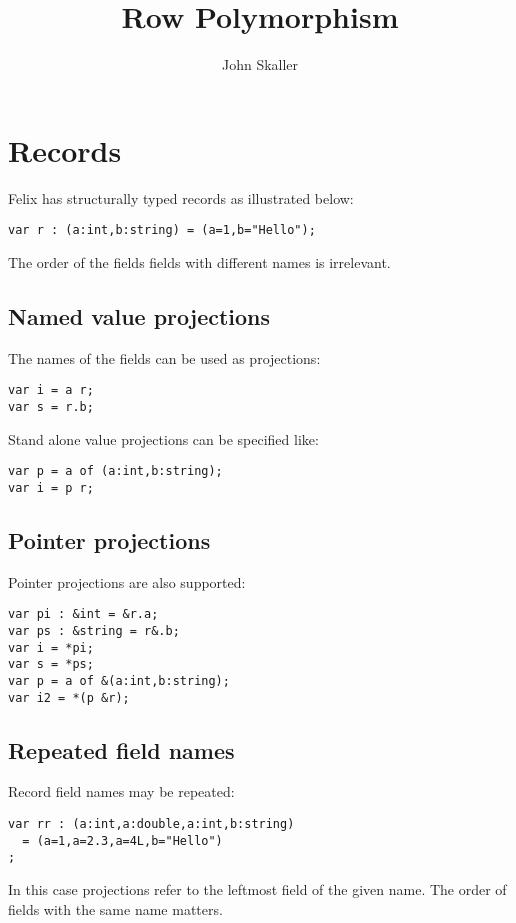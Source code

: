\documentclass{article}
\title{Row Polymorphism}
\author{John Skaller}
\begin{document}
\maketitle
\section{Records}
Felix has structurally typed records as illustrated below:

\begin{verbatim}
var r : (a:int,b:string) = (a=1,b="Hello");
\end{verbatim}

The order of the fields fields with different names
is irrelevant.

\subsection{Named value projections}
The names of the fields can be used as projections:

\begin{verbatim}
var i = a r;
var s = r.b;
\end{verbatim}

Stand alone value projections can be specified like:

\begin{verbatim}
var p = a of (a:int,b:string);
var i = p r;
\end{verbatim}

\subsection{Pointer projections}
Pointer projections are also supported:

\begin{verbatim}
var pi : &int = &r.a;
var ps : &string = r&.b;
var i = *pi;
var s = *ps;
var p = a of &(a:int,b:string);
var i2 = *(p &r);
\end{verbatim}

\subsection{Repeated field names}
Record field names may be repeated:

\begin{verbatim}
var rr : (a:int,a:double,a:int,b:string)
  = (a=1,a=2.3,a=4L,b="Hello")
;
\end{verbatim}

In this case projections refer to the leftmost field of
the given name. The order of fields with the same name
matters.
\end{document}
